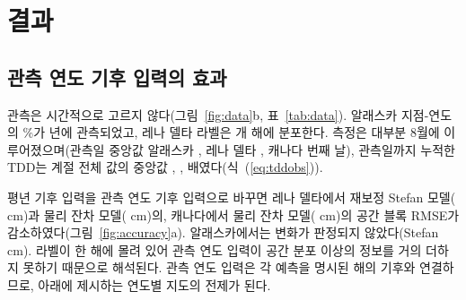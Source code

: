 \section{결과}\label{sec:results}

\subsection{관측 연도 기후 입력의 효과}
관측은 시간적으로 고르지 않다(그림~\ref{fig:data}b, 표~\ref{tab:data}). 알래스카 지점-연도의 \ntopyrshareAk\%가 \ntopyrAk{}년에 관측되었고, 레나 델타 라벨은 \nnyrLe{}개 해에 분포한다. 측정은 대부분 8월에 이루어졌으며(관측일 중앙값 알래스카 \ndoymedAk, 레나 델타 \ndoymedLe, 캐나다 \ndoymedCa{}번째 날), 관측일까지 누적한 TDD는 계절 전체 값의 중앙값 \ntddfracAk, \ntddfracLe, \ntddfracCa{}배였다(식~(\ref{eq:tddobs})).

평년 기후 입력을 관측 연도 기후 입력으로 바꾸면 레나 델타에서 재보정 Stefan 모델(\ndforcLePo{} cm)과 물리 잔차 모델(\ndforcLeRo{} cm)의, 캐나다에서 물리 잔차 모델(\ndforcCaRo{} cm)의 공간 블록 RMSE가 감소하였다(그림~\ref{fig:accuracy}a). 알래스카에서는 변화가 판정되지 않았다(Stefan \ndforcAkPo{} cm). 라벨이 한 해에 몰려 있어 관측 연도 입력이 공간 분포 이상의 정보를 거의 더하지 못하기 때문으로 해석된다. 관측 연도 입력은 각 예측을 명시된 해의 기후와 연결하므로, 아래에 제시하는 연도별 지도의 전제가 된다.


